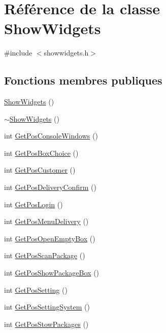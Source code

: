 \hypertarget{class_show_widgets}{}\section{Référence de la classe Show\+Widgets}
\label{class_show_widgets}


{\ttfamily \#include $<$showwidgets.\+h$>$}

\subsection*{Fonctions membres publiques}
\begin{DoxyCompactItemize}
\item 
\hyperlink{class_show_widgets_a5eebbaa78503100fc2983203787a0b5d}{Show\+Widgets} ()
\item 
\hyperlink{class_show_widgets_a18744fd531f1a33e0ae5506eca3dfa2e}{$\sim$\+Show\+Widgets} ()
\item 
int \hyperlink{class_show_widgets_a13a5bed3bbc767aae08f7e55199687da}{Get\+Pos\+Console\+Windows} ()
\item 
int \hyperlink{class_show_widgets_abee8be92674ef32ea33a60f54446ae44}{Get\+Pos\+Box\+Choice} ()
\item 
int \hyperlink{class_show_widgets_ac1975b3a7f9ed9521609955a81edb03d}{Get\+Pos\+Customer} ()
\item 
int \hyperlink{class_show_widgets_aabec56f3943570f571c18bde574c63e6}{Get\+Pos\+Delivery\+Confirm} ()
\item 
int \hyperlink{class_show_widgets_aa0273c4058ae0aead5885c2d742a6782}{Get\+Pos\+Login} ()
\item 
int \hyperlink{class_show_widgets_a4b4a3a5b84a63acc8106089927c3512b}{Get\+Pos\+Menu\+Delivery} ()
\item 
int \hyperlink{class_show_widgets_a55e7c8167da06000dd7d9bdbf1ab67ea}{Get\+Pos\+Open\+Empty\+Box} ()
\item 
int \hyperlink{class_show_widgets_a07f5e9138e49d6e509ae847abcfc2fb9}{Get\+Pos\+Scan\+Package} ()
\item 
int \hyperlink{class_show_widgets_a91143030a1dd03f77a0fbf4910a9f0da}{Get\+Pos\+Show\+Package\+Box} ()
\item 
int \hyperlink{class_show_widgets_ac8702df051c1561c701f6d6ed951bab6}{Get\+Pos\+Setting} ()
\item 
int \hyperlink{class_show_widgets_a7f0c1dfa6fc920465a967a22b25291ff}{Get\+Pos\+Setting\+System} ()
\item 
int \hyperlink{class_show_widgets_a00384a209f22e8c2512b5956af37ca73}{Get\+Pos\+Stow\+Packages} ()

\end{DoxyCompactItemize}
